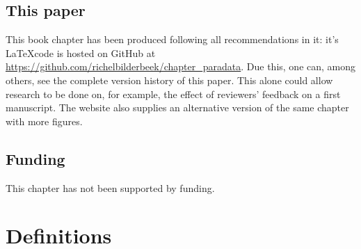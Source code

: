 \subsection{This paper}

This book chapter has been produced following all recommendations in it:
it's \LaTeX code is hosted on GitHub 
at \url{https://github.com/richelbilderbeek/chapter_paradata}.
Due this, one can, among others, see the complete version history of this paper.
This alone could allow research to be done on, for example,
the effect of reviewers' feedback on a first manuscript.
The website also supplies an alternative version of the same chapter
with more figures.

\subsection{Funding}

This chapter has not been supported by funding.

\section*{Definitions}

